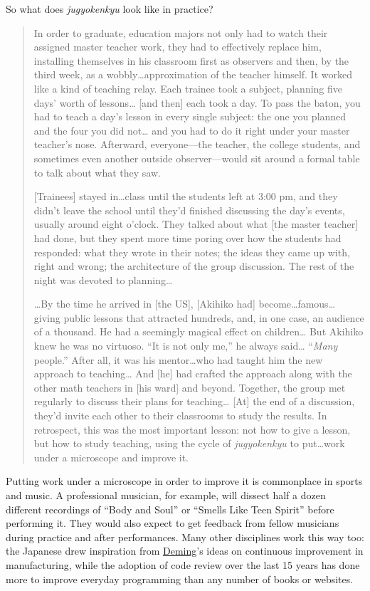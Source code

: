 So what does \emph{jugyokenkyu} look like in practice?

\begin{quotation}   %
In order to graduate,
education majors not only had to watch their assigned master teacher work,
they had to effectively replace him,
installing themselves in his classroom first as observers and then,
by the third week, as a wobbly\ldots{}approximation of the teacher himself.
It worked like a kind of teaching relay.
Each trainee took a subject,
planning five days' worth of lessons\ldots{} [and then] each took a day.
To pass the baton,
you had to teach a day's lesson in every single subject:
the one you planned and the four you did not\ldots{}
and you had to do it right under your master teacher's nose.
Afterward,
everyone---the teacher, the college students, and sometimes even another outside observer---would
sit around a formal table to talk about what they saw.

[Trainees] stayed in\ldots{}class until the students left at 3:00 pm,
and they didn't leave the school until they'd finished discussing the day's events,
usually around eight o'clock.
They talked about what [the master teacher] had done,
but they spent more time poring over how the students had responded:
what they wrote in their notes;
the ideas they came up with, right and wrong;
the architecture of the group discussion.
The rest of the night was devoted to planning\ldots{}

\ldots{}By the time he arrived in [the US],
[Akihiko had] become\ldots{}famous\ldots{}
giving public lessons that attracted hundreds,
and, in one case, an audience of a thousand.
He had a seemingly magical effect on children\ldots{}
But Akihiko knew he was no virtuoso.
``It is not only me,'' he always said\ldots{}
``\emph{Many} people.''
After all, it was his mentor\ldots{}who had taught him the new approach to teaching\ldots{}
And [he] had crafted the approach along with the other math teachers
in [his ward] and beyond.
Together, the group met regularly to discuss their plans for teaching\ldots{}
[At] the end of a discussion,
they'd invite each other to their classrooms to study the results.
In retrospect,
this was the most important lesson:
not how to give a lesson, but how to study teaching,
using the cycle of \emph{jugyokenkyu} to put\ldots{}work under a microscope and improve it.
\end{quotation}   %

Putting work under a microscope in order to improve it is commonplace in sports and music.
A professional musician, for example,
will dissect half a dozen different recordings of ``Body and Soul'' or ``Smells Like Teen Spirit'' before performing it.
They would also expect to get feedback from fellow musicians during practice and after performances.
Many other disciplines work this way too:
the Japanese drew inspiration from \href{https://en.wikipedia.org/wiki/W.\_Edwards\_Deming}{Deming}'s ideas
on continuous improvement in manufacturing,
while the adoption of code review over the last 15 years
has done more to improve everyday programming than any number of books or websites.


